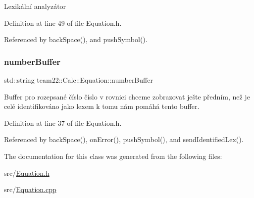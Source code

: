 Lexikální analyzátor 

Definition at line 49 of file Equation.\+h.



Referenced by back\+Space(), and push\+Symbol().

\mbox{\label{classteam22_1_1_calc_1_1_equation_a816d00b732bc472768b41da216a4335c}} 
\subsubsection{\texorpdfstring{number\+Buffer}{numberBuffer}}
{\footnotesize\ttfamily std\+::string team22\+::\+Calc\+::\+Equation\+::number\+Buffer\hspace{0.3cm}{\ttfamily [private]}}

Buffer pro rozepsané číslo číslo v rovnici chceme zobrazovat ješte předním, než je celé identifikováno jako lexem k tomu nám pomáhá tento buffer. 

Definition at line 37 of file Equation.\+h.



Referenced by back\+Space(), on\+Error(), push\+Symbol(), and send\+Identified\+Lex().



The documentation for this class was generated from the following files\+:\begin{DoxyCompactItemize}
\item 
src/\hyperlink{_equation_8h}{Equation.\+h}\item 
src/\hyperlink{_equation_8cpp}{Equation.\+cpp}\end{DoxyCompactItemize}
